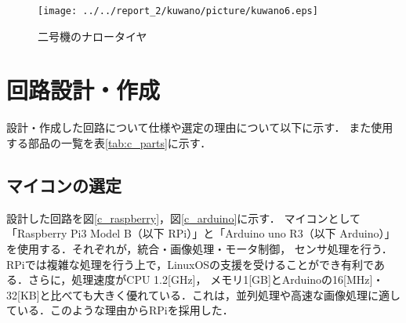 \documentclass[11pt,a4]{jsarticle}
\begin{document}
\begin{figure}[H]
  \begin{center}
    \texttt{[image: ../../report\_2/kuwano/picture/kuwano6.eps]}
    \caption{二号機のナロータイヤ}
    \label{kuwano6}
  \end{center}
\end{figure}

\newpage

\section{回路設計・作成}
設計・作成した回路について仕様や選定の理由について以下に示す．
また使用する部品の一覧を表\ref{tab:c_parts}に示す．

\subsection{マイコンの選定}
設計した回路を図\ref{c_raspberry}，図\ref{c_arduino}に示す．
マイコンとして「Raspberry Pi3 Model B（以下 RPi）」と「Arduino uno R3（以下 Arduino）」を使用する．それぞれが，統合・画像処理・モータ制御，
センサ処理を行う．RPiでは複雑な処理を行う上で，LinuxOSの支援を受けることができ有利である．さらに，処理速度がCPU 1.2[GHz]，
メモリ1[GB]とArduinoの16[MHz]・32[KB]と比べても大きく優れている．これは，並列処理や高速な画像処理に適している．このような理由からRPiを採用した．
\end{document}
